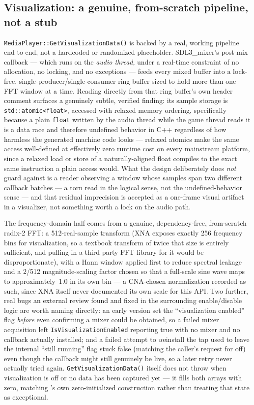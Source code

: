 \subsection{Visualization: a genuine, from-scratch pipeline, not a stub}

\texttt{MediaPlayer::GetVisualizationData()} is backed by a real, working pipeline end to end,
not a hardcoded or randomized placeholder. SDL3\_mixer's post-mix callback --- which runs on
the \emph{audio thread}, under a real-time constraint of no allocation, no locking, and no
exceptions --- feeds every mixed buffer into a lock-free, single-producer/single-consumer ring
buffer sized to hold more than one FFT window at a time. Reading directly from that ring
buffer's own header comment surfaces a genuinely subtle, verified finding: its sample storage
is \texttt{std::atomic<float>}, accessed with relaxed memory ordering, specifically because a
plain \texttt{float} written by the audio thread while the game thread reads it is a data race
and therefore undefined behavior in C++ regardless of how harmless the generated machine code
looks --- relaxed atomics make the same access well-defined at effectively zero runtime cost on
every mainstream platform, since a relaxed load or store of a naturally-aligned float compiles
to the exact same instruction a plain access would. What the design deliberately does
\emph{not} guard against is a reader observing a window whose samples span two different
callback batches --- a torn read in the logical sense, not the undefined-behavior sense --- and
that residual imprecision is accepted as a one-frame visual artifact in a visualizer, not
something worth a lock on the audio path.

The frequency-domain half comes from a genuine, dependency-free, from-scratch radix-2 FFT: a
512-real-sample transform (XNA exposes exactly 256 frequency bins for visualization, so a
textbook transform of twice that size is entirely sufficient, and pulling in a third-party FFT
library for it would be disproportionate), with a Hann window applied first to reduce spectral
leakage and a 2/512 magnitude-scaling factor chosen so that a full-scale sine wave maps
to approximately~1.0 in its own bin --- a CNA-chosen normalization recorded as such, since XNA
itself never documented its own scale for this API. Two further, real bugs an external review
found and fixed in the surrounding enable/disable logic are worth naming directly: an early
version set the ``visualization enabled'' flag \emph{before} even confirming a mixer could be
obtained, so a failed mixer acquisition left \texttt{IsVisualizationEnabled} reporting true with
no mixer and no callback actually installed; and a failed attempt to \emph{un}install the tap
used to leave the internal ``still running'' flag stuck false (matching the caller's request for
off) even though the callback might still genuinely be live, so a later retry never actually
tried again. \texttt{GetVisualizationData()} itself does not throw when visualization is off or
no data has been captured yet --- it fills both arrays with zero, matching
's own zero-initialized construction rather than treating that state
as exceptional.

